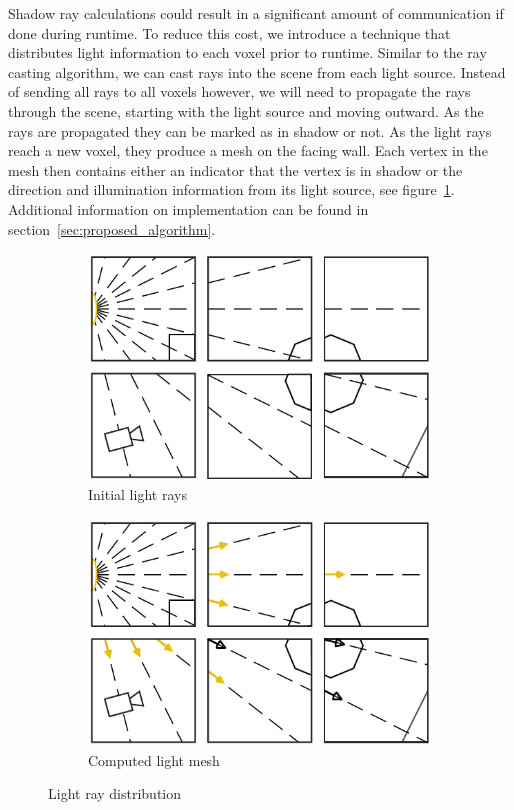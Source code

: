 Shadow ray calculations could result in a significant amount of communication if
done during runtime.  To reduce this cost, we introduce a technique that 
distributes light information to each voxel prior to runtime.  Similar to the 
ray casting algorithm, we can cast rays into the scene from each light source.  
Instead of sending all rays to all voxels however, we will need to propagate the
rays through the scene, starting with the light source and moving outward.  As
the rays are propagated they can be marked as in shadow or not.  As the light
rays reach a new voxel, they produce a mesh on the facing wall.  Each vertex in
the mesh then contains either an indicator that the vertex is in shadow or
the direction and illumination information from its light source, see 
figure~\ref{fig:light-distribution}.  Additional information on 
implementation can be found in section~\ref{sec:proposed_algorithm}.

\begin{figure}[!htb]
\centering
\begin{subfigure}{0.49\textwidth}
 \centering
  \includegraphics[width=.98\columnwidth]{drawings/Lights1.pdf}
  \caption{Initial light rays}
\end{subfigure}
\begin{subfigure}{0.49\textwidth}
 \centering
  \includegraphics[width=.98\columnwidth]{drawings/Lights2.pdf}
  \caption{Computed light mesh}
\end{subfigure}
\caption{Light ray distribution}
\label{fig:light-distribution}
\end{figure}

